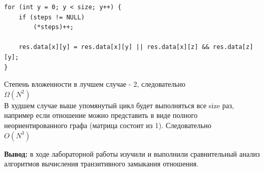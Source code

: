 \documentclass[a4paper,14pt]{extarticle}
\begin{document}
\begin{enumerate}[1.]
\begin{verbatim}
for (int y = 0; y < size; y++) {
    if (steps != NULL)
        (*steps)++;

    res.data[x][y] = res.data[x][y] || res.data[x][z] && res.data[z][y];
}
\end{verbatim}
	      Степень вложенности в лучшем случае - 2, следовательно\\
	      $\Omega(N ^ 2)$  \\
	      В худшем случае выше упомянутый цикл будет выполняться все size раз, например если отношение можно представить в виде полного неориентированного графа (матрица состоит из 1). Следовательно\\
	      $O(N^3)$\\
\end{enumerate}

\textbf{Вывод: } в ходе лабораторной работы изучили и выполнили сравнительный анализ алгоритмов вычисления транзитивного замыкания отношения.
\end{document}
